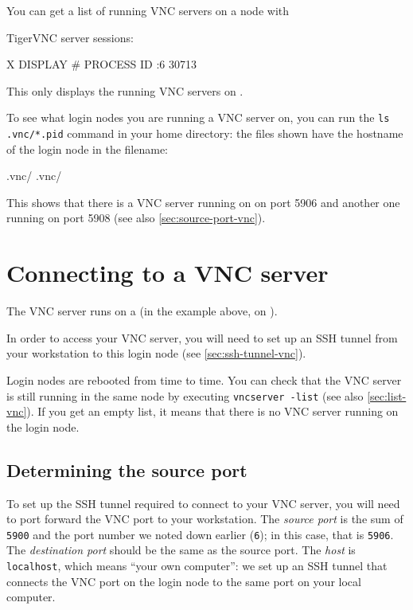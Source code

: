 You can get a list of running VNC servers on a node with

\begin{prompt}
TigerVNC server sessions:

X DISPLAY #	PROCESS ID
:6		    30713
\end{prompt}

This only displays the running VNC servers on .

To see what login nodes you are running a VNC server on, you can run the \lstinline|ls .vnc/*.pid|
command in your home directory: the files shown have the hostname of the login node in the filename:

\begin{prompt}
.vnc/%
.vnc/%
\end{prompt}

This shows that there is a VNC server running on \texttt{\loginhost{}} on port 5906
and another one running \texttt{\altloginhost{}} on port 5908 (see also \autoref{sec:source-port-vnc}).

\section{Connecting to a VNC server}

The VNC server runs on a  (in the example above, on \texttt{\loginhost{}}).

In order to access your VNC server, you will need to set up an SSH tunnel from your workstation
to this login node (see \autoref{sec:ssh-tunnel-vnc}).

Login nodes are rebooted from time to time. You can check that the VNC server is still
running in the same node by executing \lstinline|vncserver -list| (see also \autoref{sec:list-vnc}).
If you get an empty list, it means that there is no VNC server running on the login node.

\subsection{Determining the source port}
\label{sec:source-port-vnc}

To set up the SSH tunnel required to connect to your VNC server, you will need to port forward the VNC port
to your workstation. The \emph{source port} is the sum of \lstinline|5900|
and the port number we noted down earlier (\lstinline|6|); in this case, that is \lstinline|5906|.
The \emph{destination port} should be the same as the source port. The \emph{host} is \lstinline|localhost|,
which means ``your own computer'': we set up an SSH tunnel that connects
the VNC port on the login node to the same port on your local computer.

